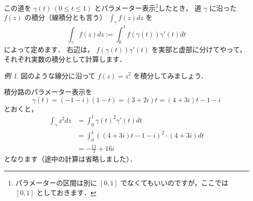 \documentclass{ltjsarticle}
\newcommand{\Complex}{\mathbf{C}}
\theoremstyle{definition}
\theoremstyle{remark}
\newtheorem{example}{例}
\begin{document}
この道を
$\gamma(t) \ (0\le t\le 1)$
とパラメーター表示\footnote{パラメーターの区間は別に $[0,1]$ でなくてもいいのですが，ここでは $[0,1]$ としておきます．}したとき，
道 $\gamma$ に沿った $f(z)$ の積分（線積分とも言う） $\int_\gamma f(z)dz$ を
\[\int_\gamma f(z)dz:=\int_0^1 f(\gamma(t))\gamma'(t)dt\]
によって定めます．
右辺は， $f(\gamma(t))\gamma'(t)$ を実部と虚部に分けてやって，それぞれ実数の積分として計算します．


\begin{example}
  図のような線分に沿って $f(z)=z^2$ を積分してみましょう．
  \begin{center}
  \end{center}
  積分路のパラメーター表示を
  \[\gamma(t)=(-1-i)(1-t)=(3+2i)t=(4+3i)t-1-i\]
  とおくと，
  \begin{align*}
    \int_\gamma z^2dz
    &=\int_0^1 \gamma(t)^2\gamma'(t)dt \\
    &=\int_0^1 ((4+3i)t-1-i)^2\cdot(4+3i) dt \\
    &=-\frac{11}{3}+16i
  \end{align*}
  となります（途中の計算は省略しました）．
\end{example}
\end{document}
